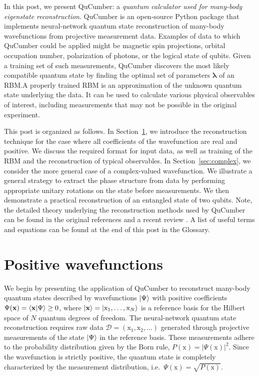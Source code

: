 \documentclass[submission, Phys, hidelnks]{SciPost}
\newcommand{\x}{\bm{\mathrm{x}}}
\begin{document}
In this post, we present QuCumber: a \textit{quantum calculator used for
many-body eigenstate reconstruction}. QuCumber is an open-source Python
package that implements neural-network quantum state reconstruction of
many-body wavefunctions from projective measurement data.
Examples of data to which QuCumber could be applied might
be magnetic spin projections, orbital occupation number,
polarization of photons, or the logical state of qubits.
Given a training set of such measurements, QuCumber discovers the most likely
compatible quantum state by finding the optimal set of
parameters $\bm{\lambda}$ of an RBM.\@ A properly trained RBM is an
approximation of the unknown quantum state underlying the data.
It can be used to calculate various physical observables of interest, including
measurements that may not be possible in the original experiment.

This post is organized as follows.
In Section~\ref{sec:positive}, we introduce the reconstruction technique for
the case where all coefficients of the wavefunction are real and positive.
We discuss the required format for input data, as well as training of the RBM
and the reconstruction of typical observables. In Section~\ref{sec:complex},
we consider the more general case of a complex-valued wavefunction.
We illustrate a general strategy to extract the phase structure from data by
performing appropriate unitary rotations on the state before measurements.
We then demonstrate a practical reconstruction of an entangled state of two
qubits.
Note, the detailed theory underlying the reconstruction methods used by QuCumber
can be found in the original references \cite{torlai_learning_2016,torlai_neural-network_2018} and a
recent review \cite{RBMreview}.
A list of useful terms and equations can be found at the end of this
post in the Glossary.

\section{Positive wavefunctions}\label{sec:positive}
We begin by presenting the application of QuCumber to reconstruct many-body
quantum states described by wavefunctions $\ket{\Psi}$ with positive
coefficients $\Psi(\x)=\braket{\x}{\Psi} \ge 0$,
where $\ket{\x}=\ket{ \mathrm{x}_1,\dots,\mathrm{x}_N }$ is a reference basis
for the Hilbert space of $N$ quantum degrees of freedom.
The neural-network quantum state reconstruction requires raw data
$\mathcal{D}=(\x_1,\x_2,\dots)$ generated through projective measurements of
the state $\ket{ \Psi}$ in the reference basis.
These measurements adhere to the probability distribution given by the Born
rule, $P(\x)=|\Psi(\x)|^2$. Since the wavefunction is strictly positive, the
quantum state is completely characterized by the measurement distribution,
i.e.~$\Psi(\x)=\sqrt{P(\x)}$.
\end{document}
